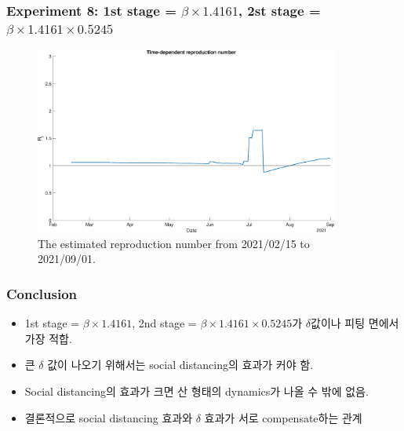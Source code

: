 \documentclass[aspectratio=169, 9pt, xcolor=dvipsnames]{beamer}
\begin{document}
	\begin{frame}\frametitle{Experiment 8: 1st stage = $\beta \times 1.4161$, 2st stage = $\beta \times 1.4161 \times 0.5245$}
	    \begin{figure}
	    	\centering
	    	\includegraphics[width=10cm]{../results/estimate_sd_1st_2_2nd_4/rep_num.eps}
	    	\caption{The estimated reproduction number from 2021/02/15 to 2021/09/01.}
	    \end{figure}
	\end{frame}

	\begin{frame}\frametitle{Conclusion}
	    \begin{itemize}
	    	\item 1st stage = $\beta \times 1.4161$, 2nd stage = $\beta \times 1.4161 \times 0.5245$가 $\delta$값이나 피팅 면에서 가장 적합.
	    	\item 큰 $\delta$ 값이 나오기 위해서는 social distancing의 효과가 커야 함.
	    	\item Social distancing의 효과가 크면 산 형태의 dynamics가 나올 수 밖에 없음.
	    	\item 결론적으로 social distancing 효과와 $\delta$ 효과가 서로 compensate하는 관계
	    \end{itemize}	
	\end{frame}
\end{document}
